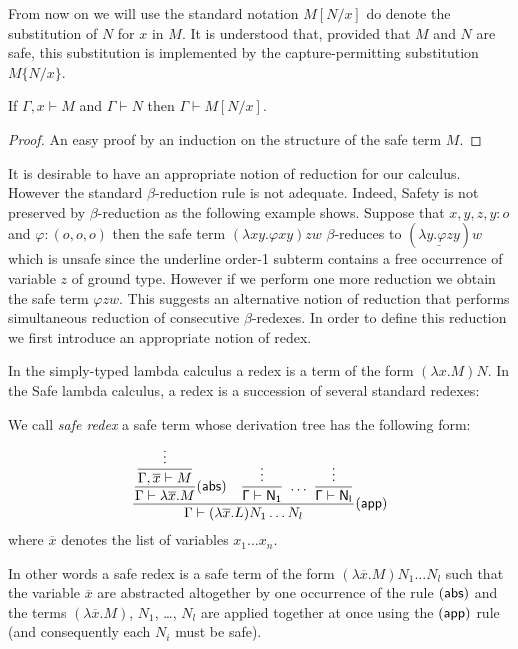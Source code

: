 \documentclass{llncs}
\newcommand\subst[2]{\left[ #1/#2 \right]}
\newcommand\captsubst[2]{\{#1/#2 \}}
\newcommand\dps{\displaystyle}
\newcommand\rulef[2]{\frac{\dps #1}{#2}}
\begin{document}
From now on we will use the standard notation $M\subst{N}{x}$ do denote the substitution of $N$ for $x$ in $M$.
It is understood that, provided that $M$ and $N$ are safe, this substitution
is implemented by the capture-permitting substitution $M\captsubst{N}{x}$.


\begin{lemma}
\label{lem:subst_preserve_safety}
If $\Gamma, x \vdash M$ and $\Gamma \vdash N$ then $\Gamma \vdash M[N/x]$.
\end{lemma}
\begin{proof}
An easy proof by an induction on the structure of the safe term $M$.
\end{proof}


It is desirable to have an appropriate notion of reduction for our calculus. However the standard $\beta$-reduction rule is not adequate. Indeed, Safety is not preserved by $\beta$-reduction as the following example shows. Suppose that $x,y,z,y : o$ and $\varphi : (o,o,o)$ then the safe term $(\lambda x y . \varphi x y) z w$ $\beta$-reduces to $(\underline{\lambda y . \varphi z y}) w$ which is unsafe since the underline order-1 subterm  contains a free occurrence of variable $z$ of ground type. However if we perform one more reduction we obtain the safe term
$\varphi z w$. This suggests an alternative notion of reduction that performs simultaneous reduction of consecutive $\beta$-redexes. In order to define this reduction we first introduce an appropriate notion of redex.

In the simply-typed lambda calculus a redex is a term of the form
$(\lambda x . M) N$. In the Safe
lambda calculus, a redex is a succession of several standard redexes:
\begin{definition}
We call \emph{safe redex} a safe term whose derivation tree has the following form:
$$   \rulef{
            \rulef{\rulef{\vdots}{\Gamma, \overline{x}\vdash M}}{\Gamma \vdash \lambda \overline{x} . M} (\sf{abs})
            \quad
            \rulef{\vdots}{\Gamma \vdash N_1}  \ \ldots \  \rulef{\vdots}{\Gamma \vdash N_l}
    }
    {
       \Gamma \vdash (\lambda \overline{x} . L) N_1 \ldots N_l
    } (\sf{app})
$$
where $\overline{x}$ denotes the list of variables $x_1\ldots x_n$.
\end{definition}

In other words a safe redex is a safe term of the form $(\lambda \overline{x} . M) N_1 \ldots N_l$ such that
the variable $\overline{x}$ are abstracted altogether by one occurrence of the rule $(\sf{abs})$ and the terms $(\lambda \overline{x} . M)$, $N_1$, \ldots, $N_l$ are applied together at once using the $(\sf{app})$ rule
(and consequently each $N_i$ must be safe).
\end{document}
